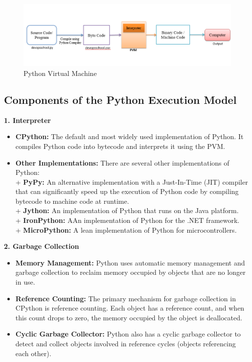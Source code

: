 \documentclass[12pt]{article}
\begin{document}
\begin{figure}[h!]
\begin{center}
\includegraphics[width=12.5cm]{mechanism1.png}\\
Python Virtual Machine
\end{center}
\end{figure}


\subsection{Components of the Python Execution Model}

\textbf{1. Interpreter}
\begin{itemize}
    \item \textbf{CPython:} The default and most widely used implementation of Python. It compiles Python code into bytecode and interprets it using the PVM.
    \item \textbf{Other Implementations:} There are several other implementations of Python:\\
    + \textbf{PyPy:} An alternative implementation with a Just-In-Time (JIT) compiler that can significantly speed up the execution of Python code by compiling bytecode to machine code at runtime.\\
    + \textbf{Jython:} An implementation of Python that runs on the Java platform.\\
    + \textbf{IronPython:} AAn implementation of Python for the .NET framework.\\
    + \textbf{MicroPython:} A lean implementation of Python for microcontrollers.\\
    
\end{itemize}

\textbf{2. Garbage Collection}
\begin{itemize}
    \item \textbf{Memory Management:} Python uses automatic memory management and garbage collection to reclaim memory occupied by objects that are no longer in use.
    \item \textbf{Reference Counting:} The primary mechanism for garbage collection in CPython is reference counting. Each object has a reference count, and when this count drops to zero, the memory occupied by the object is deallocated.
    \item \textbf{Cyclic Garbage Collector:} Python also has a cyclic garbage collector to detect and collect objects involved in reference cycles (objects referencing each other).
\end{itemize}
\end{document}
